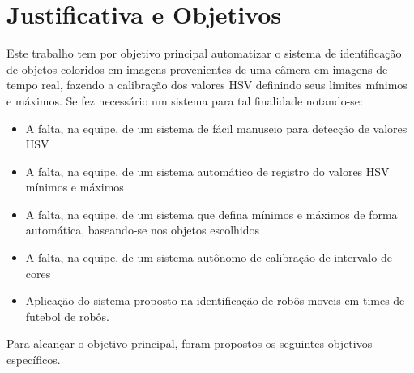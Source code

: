 % 


\section{Justificativa e Objetivos}

Este trabalho tem por objetivo principal automatizar o sistema de identificação de objetos 
coloridos em imagens provenientes de uma câmera em imagens de tempo real, fazendo a calibração dos valores HSV definindo seus limites mínimos e máximos.  
Se fez necessário um sistema para tal finalidade notando-se:

\begin{itemize}

	\item A falta, na equipe, de um sistema de fácil manuseio para detecção de valores HSV
	\item A falta, na equipe, de um sistema automático de registro do valores HSV mínimos e máximos
	\item A falta, na equipe, de um sistema que defina mínimos e máximos de forma automática, baseando-se nos objetos escolhidos
	\item A falta, na equipe, de um sistema autônomo de calibração de intervalo de cores
	\item Aplicação do sistema proposto na identificação de robôs moveis em times de futebol de robôs.
	
			

\end{itemize}

Para alcançar o objetivo principal, foram propostos os seguintes objetivos específicos.

